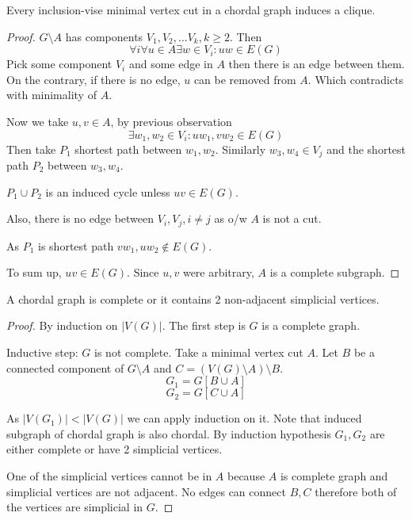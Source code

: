 \begin{lemma}[1]
	Every inclusion-vise minimal vertex cut in a chordal graph induces a clique.
\end{lemma}
\begin{proof}
	$G\setminus A$ has components $V_1, V_2, \ldots V_k, k \geq 2$.
	Then
	\[ \forall i \forall u \in A \exists w \in V_i: uw \in E(G) \]
	Pick some component $V_i$ and some edge in $A$ then there is an edge between them.
	On the contrary, if there is no edge, $u$ can be removed from $A$.
	Which contradicts with minimality of $A$.

	Now we take $u, v \in A$, by previous observation
	\[ \exists w_1, w_2 \in V_i: uw_1, vw_2 \in E(G) \]
	Then take $P_1$ shortest path between $w_1, w_2$.
	Similarly $w_3, w_4 \in V_j$ and the shortest path $P_2$ between $w_3, w_4$.

	$P_1 \cup P_2$ is an induced cycle unless $uv \in E(G)$.

	Also, there is no edge between $V_i, V_j, i \ne j$ as o/w $A$ is not a cut.

	As $P_1$ is shortest path $vw_1, uw_2 \notin E(G)$.

	To sum up, $uv \in E(G)$.
	Since $u,v$ were arbitrary, $A$ is a complete subgraph.
\end{proof}

\begin{lemma}[2]\label{chordal_lemma_2}
	A chordal graph is complete or it contains 2 non-adjacent simplicial vertices.
\end{lemma}
\begin{proof}
	By induction on $|V(G)|$.
	The first step is $G$ is a complete graph.

	Inductive step: $G$ is not complete.
	Take a minimal vertex cut $A$.
	Let $B$ be a connected component of $G\setminus A$ and $C = (V(G) \setminus A) \setminus B$.
	\[ G_1 = G[B \cup A] \]
	\[ G_2 = G[C \cup A] \]


	As $|V(G_1)| < |V(G)|$ we can apply induction on it.
	Note that induced subgraph of chordal graph is also chordal.
	By induction hypothesis $G_1, G_2$ are either complete or have 2 simplicial vertices.

	One of the simplicial vertices cannot be in $A$ because $A$ is complete graph and simplicial vertices are not adjacent.
	No edges can connect $B, C$ therefore both of the vertices are simplicial in $G$.
\end{proof}

